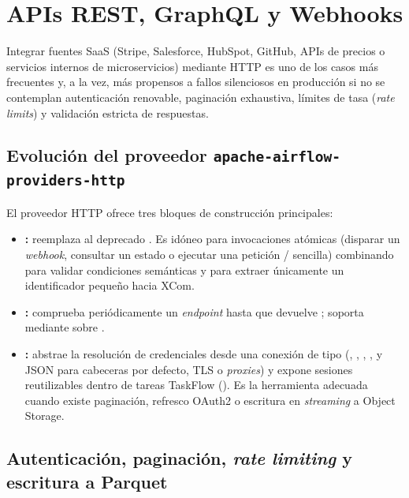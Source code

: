 \section{APIs REST, GraphQL y Webhooks}\label{sec:conectores-http}

Integrar fuentes SaaS (Stripe, Salesforce, HubSpot, GitHub, APIs de precios o servicios internos de microservicios) mediante HTTP es uno de los casos más frecuentes y, a la vez, más propensos a fallos silenciosos en producción si no se contemplan autenticación renovable, paginación exhaustiva, límites de tasa (\textit{rate limits}) y validación estricta de respuestas.

\subsection{Evolución del proveedor \texttt{apache-airflow-providers-http}}

El proveedor HTTP ofrece tres bloques de construcción principales:
\begin{itemize}
  \item \textbf{:} reemplaza al deprecado . Es idóneo para invocaciones atómicas (disparar un \textit{webhook}, consultar un estado o ejecutar una petición / sencilla) combinando  para validar condiciones semánticas y  para extraer únicamente un identificador pequeño hacia XCom.
  \item \textbf{:} comprueba periódicamente un \textit{endpoint} hasta que  devuelve ; soporta  mediante  sobre .
  \item \textbf{:} abstrae la resolución de credenciales desde una conexión de tipo  (, , , ,  y JSON  para cabeceras por defecto, TLS  o \textit{proxies}) y expone sesiones  reutilizables dentro de tareas TaskFlow (). Es la herramienta adecuada cuando existe paginación, refresco OAuth2 o escritura en \textit{streaming} a Object Storage.
\end{itemize}

\subsection{Autenticación, paginación, \textit{rate limiting} y escritura a Parquet}

